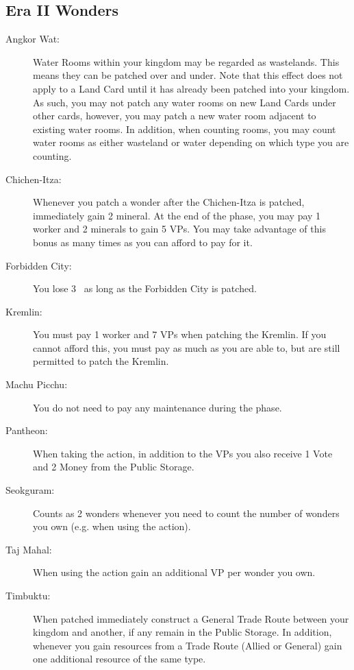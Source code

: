 \documentclass[10pt,twocolumn]{article}
\begin{document}
\begin{appendices}
\subsection{Era II Wonders}
\begin{description}
\item[Angkor Wat:] Water Rooms within your kingdom may be regarded as wastelands. This means they can be patched over and under. Note that this effect does not apply to a Land Card until it has already been patched into your kingdom. As such, you may not patch any water rooms on new Land Cards under other cards, however, you may patch a new water room adjacent to existing water rooms. In addition, when counting rooms, you may count water rooms as either wasteland or water depending on which type you are counting.
\item[Chichen-Itza:] Whenever you patch a wonder after the Chichen-Itza is patched, immediately gain 2 mineral. At the end of the  phase, you may pay 1 worker and 2 minerals to gain 5 VPs. You may take advantage of this bonus as many times as you can afford to pay for it.
\item[Forbidden City:] You lose 3 \mil\ as long as the Forbidden City is patched.
\item[Kremlin:] You must pay 1 worker and 7 VPs when patching the Kremlin. If you cannot afford this, you must pay as much as you are able to, but are still permitted to patch the Kremlin.
\item[Machu Picchu:] You do not need to pay any maintenance during the  phase.
\item[Pantheon:] When taking the  action, in addition to the VPs you also receive 1 Vote and 2 Money from the Public Storage.
\item[Seokguram:] Counts as 2 wonders whenever you need to count the number of wonders you own (e.g. when using the  action).
\item[Taj Mahal:] When using the  action gain an additional VP per wonder  you own.
\item[Timbuktu:] When patched immediately construct a General Trade Route between your kingdom and another, if any remain in the Public Storage. In addition, whenever you gain resources from a Trade Route (Allied or General) gain one additional resource of the same type.
\end{description}

\end{appendices}
\end{document}

